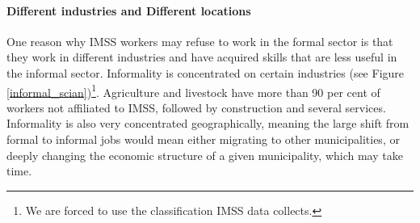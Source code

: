 \documentclass[oneside,11pt]{article}
\begin{document}
\paragraph{Different industries and Different locations} One reason why IMSS workers may refuse to work in the formal sector is that they work in different industries and have acquired skills that are less useful in the informal sector.  Informality is concentrated on certain industries (see Figure \ref{informal_scian})\footnote{We are forced to use the classification IMSS data collects.}. Agriculture and livestock have more than 90 per cent of workers not affiliated to IMSS, followed by construction and several services. Informality is also very concentrated geographically, meaning the large shift from formal to informal jobs would mean either migrating to other municipalities, or deeply changing the economic structure of a given municipality, which may take time. 
\end{document}
